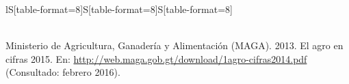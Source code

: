 {\begin{center}
\begin{tabular}{lS[table-format=8]S[table-format=8]S[table-format=8]}
				\\
				\\	
			\end{tabular}\addtocounter{Cuadro}{1}
		\end{center}
		{\footnotesize	Ministerio de Agricultura, Ganadería y Alimentación (MAGA). 2013. El agro en cifras 2015. En: \url{http://web.maga.gob.gt/download/1agro-cifras2014.pdf}  (Consultado: febrero 2016).}}
		
\newpage
		$\ $\\[-1cm]
		
		{\Bold\color{color1!80!black}{\Large COMERCIO DE ALIMENTOS}}\\[-.5cm]
		
